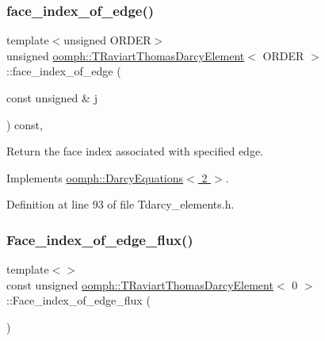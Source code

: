 \subsubsection{\texorpdfstring{face\+\_\+index\+\_\+of\+\_\+edge()}{face\_index\_of\_edge()}}
{\footnotesize\ttfamily template$<$unsigned O\+R\+D\+ER$>$ \\
unsigned \hyperlink{classoomph_1_1TRaviartThomasDarcyElement}{oomph\+::\+T\+Raviart\+Thomas\+Darcy\+Element}$<$ O\+R\+D\+ER $>$\+::face\+\_\+index\+\_\+of\+\_\+edge (\begin{DoxyParamCaption}\item[{const unsigned \&}]{j }\end{DoxyParamCaption}) const\hspace{0.3cm}{\ttfamily [inline]}, {\ttfamily [virtual]}}



Return the face index associated with specified edge. 



Implements \hyperlink{classoomph_1_1DarcyEquations_ae1ab5c1d06efe95dfd2db523c6f34eb9}{oomph\+::\+Darcy\+Equations$<$ 2 $>$}.



Definition at line 93 of file Tdarcy\+\_\+elements.\+h.

\mbox{\label{classoomph_1_1TRaviartThomasDarcyElement_ac9220c8f75234912ecebc76e95da7740}} 
\subsubsection{\texorpdfstring{Face\+\_\+index\+\_\+of\+\_\+edge\+\_\+flux()}{Face\_index\_of\_edge\_flux()}\hspace{0.1cm}{\footnotesize\ttfamily [1/2]}}
{\footnotesize\ttfamily template$<$$>$ \\
const unsigned \hyperlink{classoomph_1_1TRaviartThomasDarcyElement}{oomph\+::\+T\+Raviart\+Thomas\+Darcy\+Element}$<$ 0 $>$\+::Face\+\_\+index\+\_\+of\+\_\+edge\+\_\+flux (\begin{DoxyParamCaption}{ }\end{DoxyParamCaption})\hspace{0.3cm}{\ttfamily [private]}}



